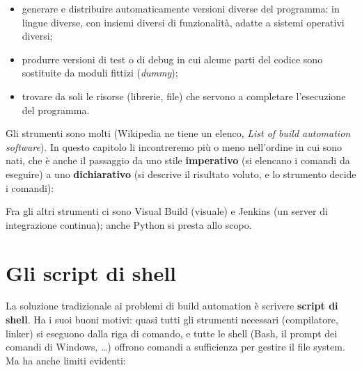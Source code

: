 \begin{itemize}
  \item generare e distribuire automaticamente versioni diverse del programma: in lingue diverse, con insiemi diversi di
        funzionalità, adatte a sistemi operativi diversi;
  \item produrre versioni di test o di debug in cui alcune parti del codice sono sostituite da moduli fittizi
        (\textit{dummy});
  \item trovare da soli le risorse (librerie, file) che servono a completare l'esecuzione del programma.
\end{itemize}

Gli strumenti sono molti (Wikipedia ne tiene un elenco, \textit{List of build automation software}). In questo
capitolo li incontreremo più o meno nell'ordine in cui sono nati, che è anche il passaggio da uno stile
\textbf{imperativo} (si elencano i comandi da eseguire) a uno \textbf{dichiarativo} (si descrive il risultato voluto, e lo
strumento decide i comandi):

\begin{center}
\end{center}

Fra gli altri strumenti ci sono Visual Build (visuale) e Jenkins (un server di integrazione continua); anche Python si
presta allo scopo.

\section{Gli script di shell}

La soluzione tradizionale ai problemi di build automation è scrivere \textbf{script di shell}. Ha i suoi buoni motivi:
quasi tutti gli strumenti necessari (compilatore, linker) si eseguono dalla riga di comando, e tutte le shell (Bash, il
prompt dei comandi di Windows, \ldots) offrono comandi a sufficienza per gestire il file system. Ma ha anche limiti
evidenti:

